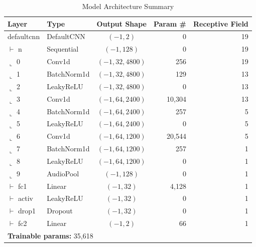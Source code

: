 \documentclass{vgtc}                          %
\begin{document}
\begin{table}[htbp]
    \centering
    \caption{Model Architecture Summary}
    
    \setlength{\tabcolsep}{3pt} %
    \footnotesize               %
    
    \renewcommand{\arraystretch}{1.1}
    \begin{tabular}{llcrr}
        \toprule
        \label{tab:model_summary} 
        \textbf{Layer} & \textbf{Type} & \textbf{Output Shape} & \textbf{Param \#} & \textbf{Receptive Field} \\
        \midrule
        defaultcnn & DefaultCNN & $(-1, 2)$ & 0 & 19 \\
        \quad $\vdash$ n & Sequential & $(-1, 128)$ & 0 & 19 \\
        \quad\quad $\llcorner$ 0 & Conv1d & $(-1, 32, 4800)$ & 256 & 19 \\
        \quad\quad $\llcorner$ 1 & BatchNorm1d & $(-1, 32, 4800)$ & 129 & 13 \\
        \quad\quad $\llcorner$ 2 & LeakyReLU & $(-1, 32, 4800)$ & 0 & 13 \\
        \quad\quad $\llcorner$ 3 & Conv1d & $(-1, 64, 2400)$ & 10,304 & 13 \\
        \quad\quad $\llcorner$ 4 & BatchNorm1d & $(-1, 64, 2400)$ & 257 & 5 \\
        \quad\quad $\llcorner$ 5 & LeakyReLU & $(-1, 64, 2400)$ & 0 & 5 \\
        \quad\quad $\llcorner$ 6 & Conv1d & $(-1, 64, 1200)$ & 20,544 & 5 \\
        \quad\quad $\llcorner$ 7 & BatchNorm1d & $(-1, 64, 1200)$ & 257 & 1 \\
        \quad\quad $\llcorner$ 8 & LeakyReLU & $(-1, 64, 1200)$ & 0 & 1 \\
        \quad\quad $\llcorner$ 9 & AudioPool & $(-1, 128)$ & 0 & 1 \\
        \quad $\vdash$ fc1 & Linear & $(-1, 32)$ & 4,128 & 1 \\
        \quad $\vdash$ activ & LeakyReLU & $(-1, 32)$ & 0 & 1 \\
        \quad $\vdash$ drop1 & Dropout & $(-1, 32)$ & 0 & 1 \\
        \quad $\vdash$ fc2 & Linear & $(-1, 2)$ & 66 & 1 \\
        \midrule
        \multicolumn{5}{l}{\textbf{Trainable params:} 35,618} \\

\end{tabular}
\end{table}
\end{document}

